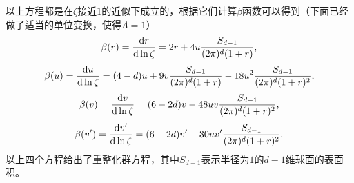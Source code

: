 \documentclass[hyperref, UTF8, a4paper]{ctexart}
\begin{document}
以上方程都是在$\zeta$接近$1$的近似下成立的，根据它们计算$\beta$函数可以得到（下面已经做了适当的单位变换，使得$\Lambda=1$）
\begin{equation}
    \beta(r) = \dv{r}{\ln \zeta} = 2 r + 4u  \frac{S_{d-1}}{(2\pi)^d (1 + r)},
\end{equation}
\begin{equation}
    \beta(u) = \dv{u}{\ln \zeta} = (4-d) u + 9v \frac{S_{d-1}}{(2\pi)^d (1+r)} - 18 u^2 \frac{S_{d-1}}{(2\pi)^d (1 + r)^2}, 
\end{equation}
\begin{equation}
    \beta(v) = \dv{v}{\ln \zeta} = (6-2d) v - 48 uv \frac{S_{d-1}}{(2\pi)^d (1+r)^2}, 
\end{equation}
\begin{equation}
    \beta(v') = \dv{v'}{\ln \zeta} = (6-2d) v' - 30 uv' \frac{S_{d-1}}{(2\pi)^d (1+r)^2}.
\end{equation}
以上四个方程给出了重整化群方程，其中$S_{d-1}$表示半径为$1$的$d-1$维球面的表面积。
\end{document}
